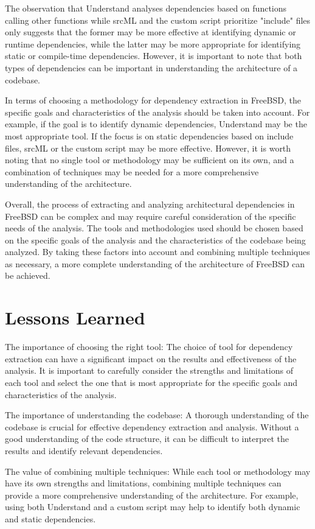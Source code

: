 \documentclass[12pt, dvipsnames, a4paper]{article}
\begin{document}
The observation that Understand analyses dependencies based on functions calling other functions while srcML and the custom script prioritize "include" files only suggests that the former may be more effective at identifying dynamic or runtime dependencies, while the latter may be more appropriate for identifying static or compile-time dependencies. However, it is important to note that both types of dependencies can be important in understanding the architecture of a codebase.

In terms of choosing a methodology for dependency extraction in FreeBSD, the specific goals and characteristics of the analysis should be taken into account. For example, if the goal is to identify dynamic dependencies, Understand may be the most appropriate tool. If the focus is on static dependencies based on include files, srcML or the custom script may be more effective. However, it is worth noting that no single tool or methodology may be sufficient on its own, and a combination of techniques may be needed for a more comprehensive understanding of the architecture.

Overall, the process of extracting and analyzing architectural dependencies in FreeBSD can be complex and may require careful consideration of the specific needs of the analysis. The tools and methodologies used should be chosen based on the specific goals of the analysis and the characteristics of the codebase being analyzed. By taking these factors into account and combining multiple techniques as necessary, a more complete understanding of the architecture of FreeBSD can be achieved.

\section{Lessons Learned}
The importance of choosing the right tool: The choice of tool for dependency extraction can have a significant impact on the results and effectiveness of the analysis. It is important to carefully consider the strengths and limitations of each tool and select the one that is most appropriate for the specific goals and characteristics of the analysis.

The importance of understanding the codebase: A thorough understanding of the codebase is crucial for effective dependency extraction and analysis. Without a good understanding of the code structure, it can be difficult to interpret the results and identify relevant dependencies.

The value of combining multiple techniques: While each tool or methodology may have its own strengths and limitations, combining multiple techniques can provide a more comprehensive understanding of the architecture. For example, using both Understand and a custom script may help to identify both dynamic and static dependencies.
\end{document}

